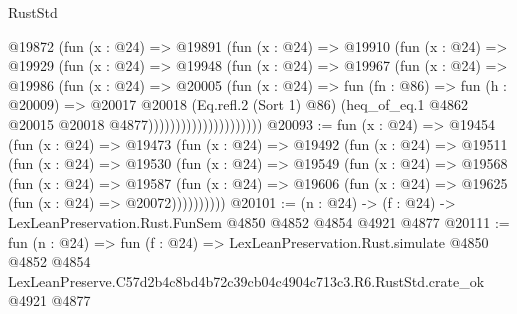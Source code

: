 \begin{lexlean}{RustStd}
\begin{coremodule}
                          @19872
                            (fun (x : @24) =>
                            @19891
                              (fun (x : @24) =>
                              @19910
                                (fun (x : @24) =>
                                @19929
                                  (fun (x : @24) =>
                                  @19948
                                    (fun (x : @24) =>
                                    @19967
                                      (fun (x : @24) =>
                                      @19986
                                        (fun (x : @24) =>
                                        @20005
                                          (fun (x : @24) =>
                                          fun (fn : @86) =>
                                          fun (h : @20009) =>
                                          @20017
                                            @20018
                                            (Eq.refl.{2} (Sort 1) @86)
                                            (heq_of_eq.{1}
                                              @4862
                                              @20015
                                              @20018
                                              @4877)))))))))))))))))))))
@20093 := fun (x : @24) =>
  @19454
    (fun (x : @24) =>
    @19473
      (fun (x : @24) =>
      @19492
        (fun (x : @24) =>
        @19511
          (fun (x : @24) =>
          @19530
            (fun (x : @24) =>
            @19549
              (fun (x : @24) =>
              @19568
                (fun (x : @24) =>
                @19587
                  (fun (x : @24) =>
                  @19606 (fun (x : @24) => @19625 (fun (x : @24) => @20072))))))))))
@20101 := (n : @24) -> (f : @24) -> LexLeanPreservation.Rust.FunSem @4850 @4852 @4854 @4921 @4877
@20111 := fun (n : @24) =>
  fun (f : @24) =>
  LexLeanPreservation.Rust.simulate
    @4850
    @4852
    @4854
    LexLeanPreserve.C57d2b4c8bd4b72c39cb04c4904c713c3.R6.RustStd.crate_ok
    @4921
    @4877
\end{coremodule}
\end{lexlean}
